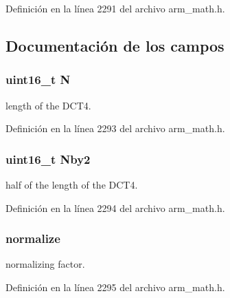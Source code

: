 Definición en la línea 2291 del archivo arm\+\_\+math.\+h.



\subsection{Documentación de los campos}
\subsubsection[{\texorpdfstring{N}{N}}]{\setlength{\rightskip}{0pt plus 5cm}uint16\+\_\+t N}\hypertarget{structarm__dct4__instance__q31_a37d49571fe35012087153c093705cd11}{}\label{structarm__dct4__instance__q31_a37d49571fe35012087153c093705cd11}
length of the D\+C\+T4. 

Definición en la línea 2293 del archivo arm\+\_\+math.\+h.

\subsubsection[{\texorpdfstring{Nby2}{Nby2}}]{\setlength{\rightskip}{0pt plus 5cm}uint16\+\_\+t Nby2}\hypertarget{structarm__dct4__instance__q31_afa64b1618089e35c2b55cff71cb29715}{}\label{structarm__dct4__instance__q31_afa64b1618089e35c2b55cff71cb29715}
half of the length of the D\+C\+T4. 

Definición en la línea 2294 del archivo arm\+\_\+math.\+h.

\subsubsection[{\texorpdfstring{normalize}{normalize}}]{ normalize}\hypertarget{structarm__dct4__instance__q31_a3a2f571658a202a38fa508098001b47c}{}\label{structarm__dct4__instance__q31_a3a2f571658a202a38fa508098001b47c}
normalizing factor. 

Definición en la línea 2295 del archivo arm\+\_\+math.\+h.

